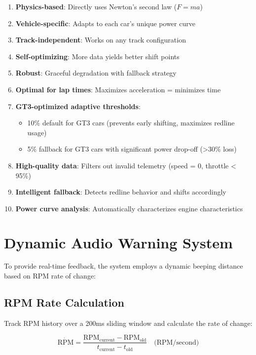 \documentclass[12pt]{article}
\begin{document}
\begin{enumerate}
    \item \textbf{Physics-based}: Directly uses Newton's second law ($F = ma$)
    \item \textbf{Vehicle-specific}: Adapts to each car's unique power curve
    \item \textbf{Track-independent}: Works on any track configuration
    \item \textbf{Self-optimizing}: More data yields better shift points
    \item \textbf{Robust}: Graceful degradation with fallback strategy
    \item \textbf{Optimal for lap times}: Maximizes acceleration = minimizes time
    \item \textbf{GT3-optimized adaptive thresholds}:
    \begin{itemize}
        \item 10\% default for GT3 cars (prevents early shifting, maximizes redline usage)
        \item 5\% fallback for GT3 cars with significant power drop-off (>30\% loss)
    \end{itemize}
    \item \textbf{High-quality data}: Filters out invalid telemetry (speed = 0, throttle < 95\%)
    \item \textbf{Intelligent fallback}: Detects redline behavior and shifts accordingly
    \item \textbf{Power curve analysis}: Automatically characterizes engine characteristics
\end{enumerate}

\section{Dynamic Audio Warning System}

To provide real-time feedback, the system employs a dynamic beeping distance based on RPM rate of change:

\subsection{RPM Rate Calculation}

Track RPM history over a 200ms sliding window and calculate the rate of change:

\begin{equation}
\dot{\text{RPM}} = \frac{\text{RPM}_{\text{current}} - \text{RPM}_{\text{old}}}{t_{\text{current}} - t_{\text{old}}} \quad \text{(RPM/second)}
\end{equation}
\end{document}
